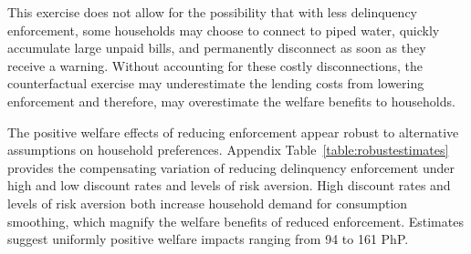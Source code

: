 \documentclass[12pt,table]{article}
\begin{document}
This exercise does not allow for the possibility that with less delinquency enforcement, some households may choose to connect to piped water, quickly accumulate large unpaid bills, and permanently disconnect as soon as they receive a warning.  Without accounting for these costly disconnections, the counterfactual exercise may underestimate the lending costs from lowering enforcement and therefore, may overestimate the welfare benefits to households.

The positive welfare effects of reducing enforcement appear robust to alternative assumptions on household preferences.  Appendix Table~\ref{table:robustestimates} provides the compensating variation of reducing delinquency enforcement under high and low discount rates and levels of risk aversion.  High discount rates and levels of risk aversion both increase household demand for consumption smoothing, which magnify the welfare benefits of reduced enforcement.  Estimates suggest uniformly positive welfare impacts ranging from 94 to 161 PhP.













\end{document}
